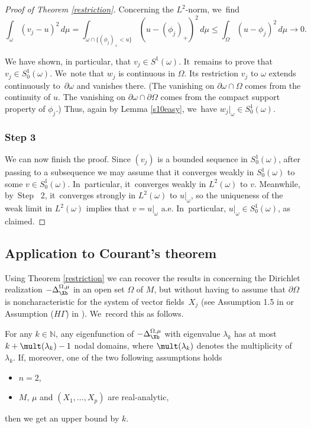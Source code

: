 \begin{proof}[Proof of Theorem \ref{restriction}]
Concerning the $L^2$-norm, we~find
\[
\int_\omega (v_j - u)^2\,d\mu = \int_{\omega\cap\{ (\phi_j)_+< u\}} (u - (\phi_j)_+)^2\,d\mu
\leq \int_\Omega (u-\phi_j)^2\,d\mu \to 0.
\]

We have shown, in particular, that $v_j\in S^1(\omega)$. It~remains to prove that $v_j\in S^1_0(\omega)$. We~note that $w_j$ is continuous in $\Omega$. Its restriction $v_j$ to $\omega$ extends continuously to~$\partial\omega$ and vanishes there. (The vanishing on $\partial\omega\cap\Omega$ comes from the continuity of $u$. The vanishing on $\partial\omega\cap\partial\Omega$ comes from the compact support property of $\phi_j$.) Thus, again by Lemma \ref{s10easy}, we~have $w_j|_\omega\in S^1_0(\omega)$.

\subsubsection*{Step 3} We can now finish the proof. Since $(v_j)$ is a bounded sequence in $S^1_0(\omega)$, after passing to a subsequence we may assume that it converges weakly in $S^1_0(\omega)$ to some $v\in S^1_0(\omega)$. In~particular, it~converges weakly in $L^2(\omega)$ to $v$. Meanwhile, by~Step~ 2, it~converges strongly in $L^2(\omega)$ to $u|_\omega$, so the uniqueness of the weak limit in $L^2(\omega)$ implies that $v=u|_\omega$ a.e. In~particular, $u|_\omega\in S^1_0(\omega)$, as claimed.
\end{proof}

\subsection{Application to Courant's theorem}\label{ss2.7}
Using Theorem \ref{restriction} we can recover the results in \cite{EL} concerning the Dirichlet realization $-\Delta^{\Omega,\mu}_\Xb$ in an open set $\Omega$ of $M$, but without having to assume that $\partial \Omega$ is noncharacteristic for the system of vector fields~$X_j$ (see Assumption 1.5 in \cite{EL} or Assumption ($H\Gamma$) in \cite{De}). We~record this as follows.

\begin{theorem}\label{courant}
For any $k\in \mathbb N$, any eigenfunction of $-\Delta_\Xb^{\Omega,\mu}$ with eigenvalue $\lambda_k$ has at most
$k+ \mult(\lambda_k)-1$ nodal domains, where $\mult(\lambda_k)$ denotes the multiplicity of~$\lambda_k$.
If, moreover, one of the two following assumptions holds
\begin{itemize}
\item $n=2$,
\item $M$, $\mu$ and $(X_1,\dots, X_p)$ are real-analytic,
\end{itemize}
then we get an upper bound by $k$.
\end{theorem}

